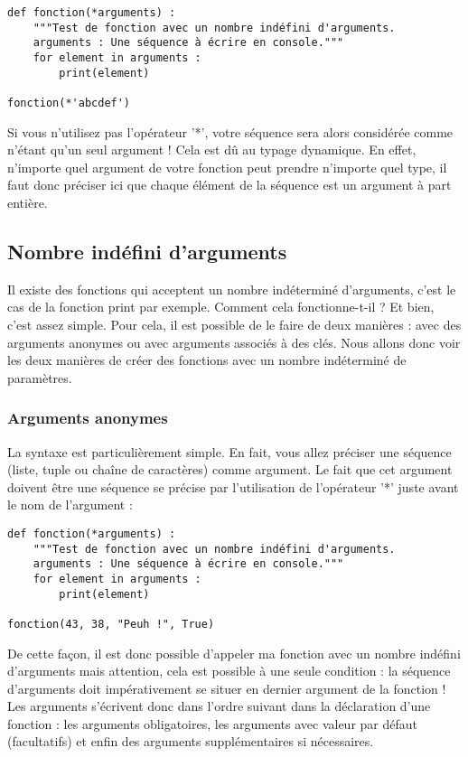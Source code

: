 \documentclass[a4paper,twoside]{article}
\begin{document}
\begin{verbatim}
def fonction(*arguments) :
    """Test de fonction avec un nombre indéfini d'arguments.
    arguments : Une séquence à écrire en console."""
    for element in arguments :
        print(element)

fonction(*'abcdef')
\end{verbatim}

Si vous n'utilisez pas l'opérateur '*', votre séquence sera alors considérée comme n'étant qu'un seul argument ! Cela est dû au typage dynamique. En effet, n'importe quel argument de votre fonction peut prendre n'importe quel type, il faut donc préciser ici que chaque élément de la séquence est un argument à part entière.

\subsection{Nombre indéfini d'arguments}

Il existe des fonctions qui acceptent un nombre indéterminé d'arguments, c'est le cas de la fonction print par exemple. Comment cela fonctionne-t-il ? Et bien, c'est assez simple. Pour cela, il est possible de le faire de deux manières : avec des arguments anonymes ou avec arguments associés à des clés. Nous allons donc voir les deux manières de créer des fonctions avec un nombre indéterminé de paramètres.

\subsubsection{Arguments anonymes}

La syntaxe est particulièrement simple. En fait, vous allez préciser une séquence (liste, tuple ou chaîne de caractères) comme argument. Le fait que cet argument doivent être une séquence se précise par l'utilisation de l'opérateur '*' juste avant le nom de l'argument :

\begin{verbatim}
def fonction(*arguments) :
    """Test de fonction avec un nombre indéfini d'arguments.
    arguments : Une séquence à écrire en console."""
    for element in arguments :
        print(element)

fonction(43, 38, "Peuh !", True)
\end{verbatim}

De cette façon, il est donc possible d'appeler ma fonction avec un nombre indéfini d'arguments mais attention, cela est possible à une seule condition : la séquence d'arguments doit impérativement se situer en dernier argument de la fonction ! Les arguments s'écrivent donc dans l'ordre suivant dans la déclaration d'une fonction : les arguments obligatoires, les arguments avec valeur par défaut (facultatifs) et enfin des arguments supplémentaires si nécessaires.
\end{document}
